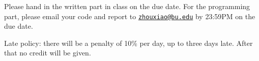 \documentclass[12pt]{report}
\begin{document}
\date{August 2, 2017}   %
\maketitle

\vspace{-.25in}
\begin{enumerate}[leftmargin=.15in, itemsep=0pt]
\item[$\diamond$] \small{Please hand in the written part in class on the due date. For the programming part, please email your code and report to \href{mailto:zhouxiao@bu.edu}{\texttt{zhouxiao@bu.edu}} by 23:59PM on the due date.
\item[$\diamond$] \small{Late policy: there will be a penalty of 10\% per day, up to three days late.  After that no credit will be given. }}
\end{enumerate}
\end{document}
